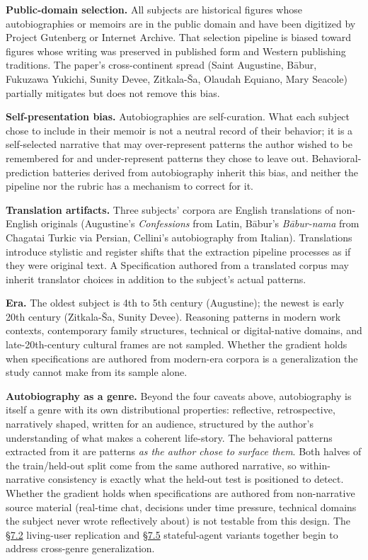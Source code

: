 \textbf{Public-domain selection.} All subjects are historical figures
whose autobiographies or memoirs are in the public domain and have been
digitized by Project Gutenberg or Internet Archive. That selection
pipeline is biased toward figures whose writing was preserved in
published form and Western publishing traditions. The paper's
cross-continent spread (Saint Augustine, Bābur, Fukuzawa Yukichi, Sunity
Devee, Zitkala-Ša, Olaudah Equiano, Mary Seacole) partially mitigates
but does not remove this bias.

\textbf{Self-presentation bias.} Autobiographies are self-curation. What
each subject chose to include in their memoir is not a neutral record of
their behavior; it is a self-selected narrative that may over-represent
patterns the author wished to be remembered for and under-represent
patterns they chose to leave out. Behavioral-prediction batteries
derived from autobiography inherit this bias, and neither the pipeline
nor the rubric has a mechanism to correct for it.

\textbf{Translation artifacts.} Three subjects' corpora are English
translations of non-English originals (Augustine's \emph{Confessions}
from Latin, Bābur's \emph{Bābur-nama} from Chagatai Turkic via Persian,
Cellini's autobiography from Italian). Translations introduce stylistic
and register shifts that the extraction pipeline processes as if they
were original text. A Specification authored from a translated corpus
may inherit translator choices in addition to the subject's actual
patterns.

\textbf{Era.} The oldest subject is 4th to 5th century (Augustine); the
newest is early 20th century (Zitkala-Ša, Sunity Devee). Reasoning
patterns in modern work contexts, contemporary family structures,
technical or digital-native domains, and late-20th-century cultural
frames are not sampled. Whether the gradient holds when specifications
are authored from modern-era corpora is a generalization the study
cannot make from its sample alone.

\textbf{Autobiography as a genre.} Beyond the four caveats above,
autobiography is itself a genre with its own distributional properties:
reflective, retrospective, narratively shaped, written for an audience,
structured by the author's understanding of what makes a coherent
life-story. The behavioral patterns extracted from it are patterns
\emph{as the author chose to surface them}. Both halves of the
train/held-out split come from the same authored narrative, so
within-narrative consistency is exactly what the held-out test is
positioned to detect. Whether the gradient holds when specifications are
authored from non-narrative source material (real-time chat, decisions
under time pressure, technical domains the subject never wrote
reflectively about) is not testable from this design. The \hyperref[measurement-methodology]{§7.2}
living-user replication and \hyperref[stateful-agent-implementations-and-temporal-drift-tracking]{§7.5} stateful-agent variants together begin
to address cross-genre generalization.

